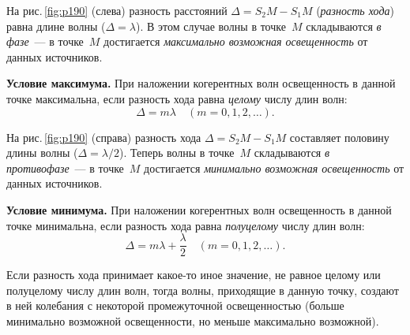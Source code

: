 \documentclass[main.tex]{subfiles}
\begin{document}
На рис.\,\ref{fig:p190} (слева) разность расстояний $\Delta = S_2M-S_1M$ (\emph{разность хода}) равна длине волны ($\Delta=\lambda$). В этом случае волны в точке~$M$ складываются \emph{в фазе}~--- в точке~$M$ достигается \emph{максимально возможная освещенность} от данных источников.
%
\begin{law}
    \textbf{Условие максимума.} При наложении когерентных волн освещенность в данной точке максимальна, если разность хода равна \emph{целому} числу длин волн:
    \begin{equation}
        \Delta=m\lambda\quad(m=0,1,2,\ldots).
    \end{equation}
\end{law}
%
На рис.\,\ref{fig:p190} (справа) разность хода $\Delta = S_2M-S_1M$ составляет половину длины волны ($\Delta=\lambda/2$). Теперь волны в точке~$M$ складываются \emph{в противофазе}~--- в точке~$M$ достигается \emph{минимально возможная освещенность} от данных источников.
%
\begin{law}
    \textbf{Условие минимума.} При наложении когерентных волн освещенность в данной точке минимальна, если разность хода равна \emph{полуцелому} числу длин волн:
    \begin{equation}
        \Delta=m\lambda+\frac{\lambda}{2}\quad(m=0,1,2,\ldots).
    \end{equation}
\end{law}
%
%
Если разность хода принимает какое-то иное значение, не равное целому или полуцелому числу длин волн, тогда волны, приходящие в данную точку, создают в ней колебания с некоторой промежуточной освещенностью (больше минимально возможной освещенности, но меньше максимально возможной).

 
\end{document}
